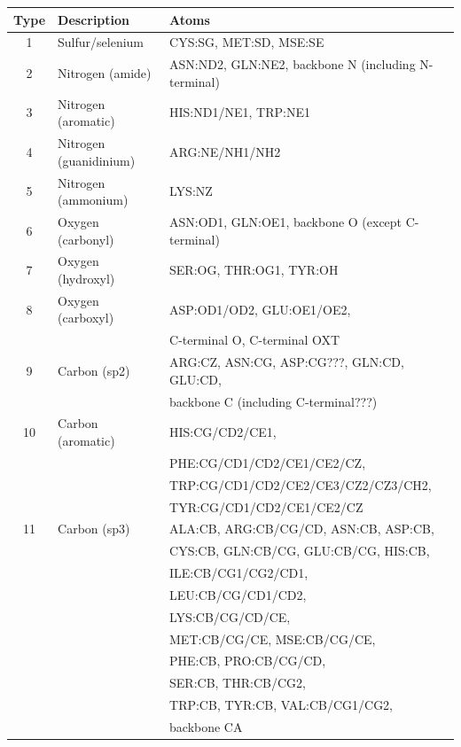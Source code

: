 \begin{table}[H]
\begin{center}
\begin{tabular}{ c | l | l }
    
    Type & Description & Atoms \\
    \hline
    1 & Sulfur/selenium & CYS:SG, MET:SD, MSE:SE \\ \hline
    2 & Nitrogen (amide) & ASN:ND2, GLN:NE2, backbone N (including N-terminal) \\ \hline
    3 & Nitrogen (aromatic) & HIS:ND1/NE1, TRP:NE1 \\ \hline
    4 & Nitrogen (guanidinium) & ARG:NE/NH1/NH2 \\ \hline
    5 & Nitrogen (ammonium) & LYS:NZ \\ \hline
    6 & Oxygen (carbonyl) & ASN:OD1, GLN:OE1, backbone O (except C-terminal) \\ \hline
    7 & Oxygen (hydroxyl) & SER:OG, THR:OG1, TYR:OH \\ \hline
    8 & Oxygen (carboxyl) & ASP:OD1/OD2, GLU:OE1/OE2, \\
     & & C-terminal O, C-terminal OXT \\ \hline
    9 & Carbon (sp2) & ARG:CZ, ASN:CG, ASP:CG???, GLN:CD, GLU:CD, \\
     & & backbone C (including C-terminal???) \\ \hline
    10 & Carbon (aromatic) & HIS:CG/CD2/CE1, \\
     & & PHE:CG/CD1/CD2/CE1/CE2/CZ, \\ 
     & & TRP:CG/CD1/CD2/CE2/CE3/CZ2/CZ3/CH2, \\
     & & TYR:CG/CD1/CD2/CE1/CE2/CZ \\ \hline
    11 & Carbon (sp3) & ALA:CB, ARG:CB/CG/CD, ASN:CB, ASP:CB, \\
     & & CYS:CB, GLN:CB/CG, GLU:CB/CG, HIS:CB, \\
     & & ILE:CB/CG1/CG2/CD1, \\
     & & LEU:CB/CG/CD1/CD2, \\
     & & LYS:CB/CG/CD/CE, \\
     & & MET:CB/CG/CE, MSE:CB/CG/CE, \\
     & & PHE:CB, PRO:CB/CG/CD, \\
     & & SER:CB, THR:CB/CG2, \\
     & & TRP:CB, TYR:CB, VAL:CB/CG1/CG2, \\
     & & backbone CA \\ \hline
    

\end{tabular}
\end{center}
\end{table}
